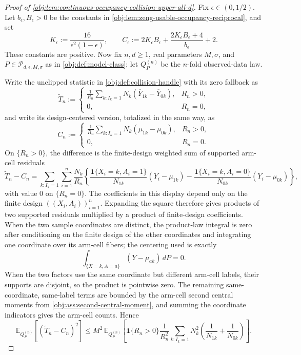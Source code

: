 \begin{proof}[Proof of \cref{obj:lem:continuous-occupancy-collision-upper-all-d}]
Fix \(\epsilon\in(0,1/2)\).  Let \(b_\epsilon,B_\epsilon>0\) be the constants in \cref{obj:lem:zeng-usable-occupancy-reciprocal}, and set
\[
K_\epsilon:=\frac{16}{\epsilon^2(1-\epsilon)},\qquad
C_\epsilon:=2K_\epsilon B_\epsilon+
\frac{2K_\epsilon B_\epsilon+4}{b_\epsilon}+2 .
\]
These constants are positive.  Now fix \(n,d\ge1\), real parameters \(M,\sigma\), and \(P\in\mathcal P_{d,\epsilon,M,\sigma}\) as in \cref{obj:def:model-class}; let \(Q_P^{(n)}\) be the \(n\)-fold observed-data law. %

Write the unclipped statistic in \cref{obj:def:collision-handle} with its zero fallback as
\[
\widetilde T_n
:=
\begin{cases}
\displaystyle
\frac1{R_n}
\sum_{k:I_k=1}N_k(\overline Y_{1k}-\overline Y_{0k}),& R_n>0,\\[1ex]
0,& R_n=0,
\end{cases}
\]
and write its design-centered version, totalized in the same way, as
\[
C_n
:=
\begin{cases}
\displaystyle
\frac1{R_n}
\sum_{k:I_k=1}N_k(\mu_{1k}-\mu_{0k}),& R_n>0,\\[1ex]
0,& R_n=0.
\end{cases}
\]
On \(\{R_n>0\}\), the difference is the finite-design weighted sum of supported arm-cell residuals
\[
\widetilde T_n-C_n
=
\sum_{k:I_k=1}\sum_{i=1}^n
\frac{N_k}{R_n}
\left\{
\frac{\mathbf 1\{X_i=k,A_i=1\}}{N_{1k}}(Y_i-\mu_{1k})
-
\frac{\mathbf 1\{X_i=k,A_i=0\}}{N_{0k}}(Y_i-\mu_{0k})
\right\},
\]
with value \(0\) on \(\{R_n=0\}\).  The coefficients in this display depend only on the finite design \(((X_i,A_i))_{i=1}^n\).  Expanding the square therefore gives products of two supported residuals multiplied by a product of finite-design coefficients.  When the two sample coordinates are distinct, the product-law integral is zero after conditioning on the finite design of the other coordinates and integrating one coordinate over its arm-cell fibers; the centering used is exactly
\[
\int_{\{X=k,A=a\}}(Y-\mu_{ak})\,dP=0.
\]
When the two factors use the same coordinate but different arm-cell labels, their supports are disjoint, so the product is pointwise zero.  The remaining same-coordinate, same-label terms are bounded by the arm-cell second central moments from \cref{obj:ass:second-central-moment}, and summing the coordinate indicators gives the arm-cell counts.  Hence
\[
\mathbb E_{Q_P^{(n)}}\!\left[(\widetilde T_n-C_n)^2\right]
\le
M^2\,
\mathbb E_{Q_P^{(n)}}\!\left[
\mathbf 1\{R_n>0\}\frac1{R_n^2}
\sum_{k:I_k=1}N_k^2
\left(\frac1{N_{1k}}+\frac1{N_{0k}}\right)
\right].
\]


\end{proof}
